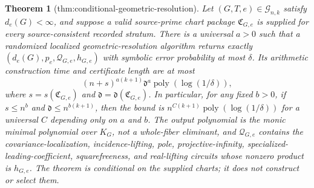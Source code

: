 \documentclass{article}
\newtheorem{theorem}{Theorem}
\begin{document}
\begin{theorem}[thm:conditional-geometric-resolution]\label{thm:conditional-geometric-resolution}
Let \((G,T,e)\in\mathcal G_{n,k}\) satisfy \(d_e(G)<\infty\), and suppose a valid source-prime chart package \(\mathfrak C_{G,e}\) is supplied for every source-consistent recorded stratum. There is a universal \(a>0\) such that a randomized localized geometric-resolution algorithm returns exactly \((d_e(G),p_e,\mathcal Q_{G,e},h_{G,e})\) with symbolic error probability at most \(\delta\). Its arithmetic construction time and certificate length are at most
\[
(n+s)^{a(k+1)}\mathfrak d^a\operatorname{poly}(\log(1/\delta)),
\]
where \(s=s(\mathfrak C_{G,e})\) and \(\mathfrak d=\mathfrak d(\mathfrak C_{G,e})\). In particular, for any fixed \(b>0\), if \(s\leq n^b\) and \(\mathfrak d\leq n^{b(k+1)}\), then the bound is \(n^{C(k+1)}\operatorname{poly}(\log(1/\delta))\) for a universal \(C\) depending only on \(a\) and \(b\). The output polynomial is the monic minimal polynomial over \(K_G\), not a whole-fiber eliminant, and \(\mathcal Q_{G,e}\) contains the covariance-localization, incidence-lifting, pole, projective-infinity, specialized-leading-coefficient, squarefreeness, and real-lifting circuits whose nonzero product is \(h_{G,e}\). The theorem is conditional on the supplied charts; it does not construct or select them.
\end{theorem}
\end{document}
